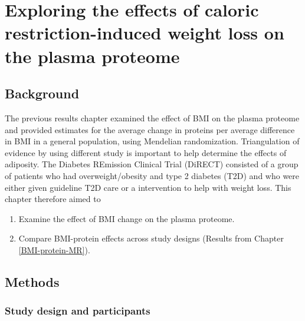 \documentclass[11pt,twoside]{bristolthesis}
\providecommand{\tightlist}{%
  \setlength{\itemsep}{0pt}\setlength{\parskip}{0pt}}
\begin{document}
\hypertarget{exploring-the-effects-of-caloric-restriction-induced-weight-loss-on-the-plasma-proteome}{%
\chapter{Exploring the effects of caloric restriction-induced weight loss on the plasma proteome}\label{exploring-the-effects-of-caloric-restriction-induced-weight-loss-on-the-plasma-proteome}}

\hypertarget{background-5}{%
\section{Background}\label{background-5}}

The previous results chapter examined the effect of BMI on the plasma proteome and provided estimates for the average change in proteins per average difference in BMI in a general population, using Mendelian randomization. Triangulation of evidence by using different study is important to help determine the effects of adiposity. The Diabetes REmission Clinical Trial (DiRECT) consisted of a group of patients who had overweight/obesity and type 2 diabetes (T2D) and who were either given guideline T2D care or a intervention to help with weight loss. This chapter therefore aimed to
\begin{enumerate}
\def\labelenumi{\arabic{enumi})}
\tightlist
\item
  Examine the effect of BMI change on the plasma proteome.
\item
  Compare BMI-protein effects across study designs (Results from Chapter \ref{BMI-protein-MR}).
\end{enumerate}
\hypertarget{methods-4}{%
\section{Methods}\label{methods-4}}

\hypertarget{study-design-and-participants}{%
\subsection{Study design and participants}\label{study-design-and-participants}}
\end{document}
